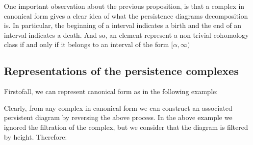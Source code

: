 
One important observation about the previous proposition,
is that a complex in canonical form gives a clear idea of what the persistence 
diagrams decomposition is. In particular, the beginning of a interval
indicates a birth and the end of an interval indicates a death. And
so, an element represent a non-trivial cohomology class if and only if
it belongs to an interval of the form $[\alpha,\infty)$

\subsection{Representations of the persistence complexes}

%


%

%
%




Firstofall, we can represent canonical form as in the following example:



Clearly, from any complex in canonical form we can construct an associated persistent diagram by reversing the above process.
In the above example we ignored the filtration of the complex, but we consider that the diagram is filtered by height.
 Therefore:

